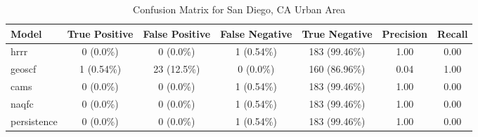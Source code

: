 \begin{table}[h!]
\centering
\begin{tabular}{lcccccc}
\hline
Model & True Positive & False Positive & False Negative & True Negative & Precision & Recall\\ \hline
hrrr & 0 (0.0\%) & 0 (0.0\%) & 1 (0.54\%) & 183 (99.46\%) & \cellcolor{green!25}1.00 & \cellcolor{green!25}0.00 \\ 
geoscf & 1 (0.54\%) & 23 (12.5\%) & 0 (0.0\%) & 160 (86.96\%) & \cellcolor{red!25}0.04 & \cellcolor{green!25}1.00 \\ 
cams & 0 (0.0\%) & 0 (0.0\%) & 1 (0.54\%) & 183 (99.46\%) & \cellcolor{green!25}1.00 & \cellcolor{green!25}0.00 \\ 
naqfc & 0 (0.0\%) & 0 (0.0\%) & 1 (0.54\%) & 183 (99.46\%) & \cellcolor{green!25}1.00 & \cellcolor{green!25}0.00 \\ 
persistence & 0 (0.0\%) & 0 (0.0\%) & 1 (0.54\%) & 183 (99.46\%) & 1.00 & 0.00 \\ 
\hline
\end{tabular}
\caption{Confusion Matrix for San Diego, CA Urban Area}
\end{table}
